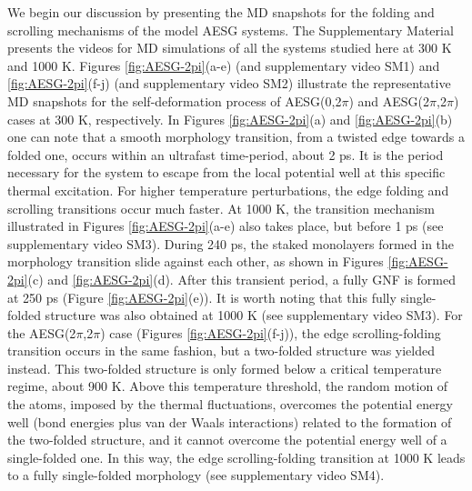 \documentclass[twoside,twocolumn,9pt]{article}
\begin{document}
We begin our discussion by presenting the MD snapshots for the folding and scrolling mechanisms of the model AESG systems. The Supplementary Material presents the videos for MD simulations of all the systems studied here at 300 K and 1000 K. Figures \ref{fig:AESG-2pi}(a-e) (and supplementary video SM1) and \ref{fig:AESG-2pi}(f-j) (and supplementary video SM2) illustrate the representative MD snapshots for the self-deformation process of AESG(0,2$\pi$) and AESG(2$\pi$,2$\pi$) cases at 300 K, respectively. In Figures \ref{fig:AESG-2pi}(a) and \ref{fig:AESG-2pi}(b) one can note that a smooth morphology transition, from a twisted edge towards a folded one, occurs within an ultrafast time-period, about 2 ps. It is the period necessary for the system to escape from the local potential well at this specific thermal excitation. For higher temperature perturbations, the edge folding and scrolling transitions occur much faster. At 1000 K, the transition mechanism illustrated in Figures \ref{fig:AESG-2pi}(a-e) also takes place, but before 1 ps (see supplementary video SM3). During 240 ps, the staked monolayers formed in the morphology transition slide against each other, as shown in Figures \ref{fig:AESG-2pi}(c) and \ref{fig:AESG-2pi}(d). After this transient period, a fully GNF is formed at 250 ps (Figure \ref{fig:AESG-2pi}(e)). It is worth noting that this fully single-folded structure was also obtained at 1000 K (see supplementary video SM3). For the AESG(2$\pi$,2$\pi$) case (Figures \ref{fig:AESG-2pi}(f-j)), the edge scrolling-folding transition occurs in the same fashion, but a two-folded structure was yielded instead. This two-folded structure is only formed below a critical temperature regime, about 900 K. Above this temperature threshold, the random motion of the atoms, imposed by the thermal fluctuations, overcomes the potential energy well (bond energies plus van der Waals interactions) related to the formation of the two-folded structure, and it cannot overcome the potential energy well of a single-folded one. In this way, the edge scrolling-folding transition at 1000 K leads to a fully single-folded morphology (see supplementary video SM4).  
\end{document}
